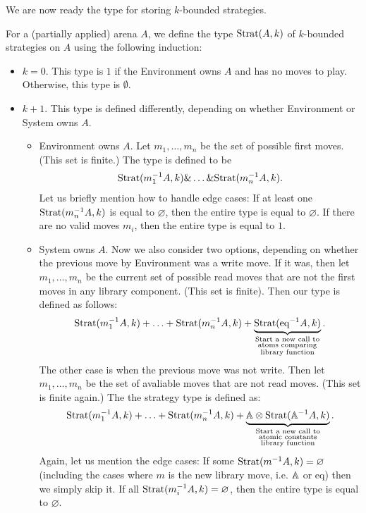 We are now ready the type for storing $k$-bounded strategies. 
\begin{definition}
    For a (partially applied) arena $A$, we define the type $\text{Strat}(A, k)$ of $k$-bounded strategies on $A$ using the following induction:
\begin{itemize}
    \item $k=0$. This type is $1$ if the Environment owns $A$ and has no moves to play. Otherwise, this type is $\emptyset$. 
    \item $k + 1$. This type is defined differently, depending on whether Environment or System owns $A$.
    \begin{itemize}
        \item Environment owns $A$. Let $m_1,\ldots,m_n$ be the set of possible first moves. (This set is finite.) The type is defined to be 
        \begin{align*}
            \text{Strat}(m_1^{-1}A, k) \& \ldots \& \text{Strat}(m_n^{-1}A, k).
        \end{align*}
        Let us briefly mention how to handle edge cases: If at least one $\text{Strat}(m_n^{-1}A, k)$ is equal to $\varnothing$, then 
        the entire type is equal to $\varnothing$. If there are no valid moves $m_i$, then the entire type is equal to $1$. 
        \item System owns $A$. Now we also consider two options, depending on whether the previous move by Environment was a write move. 
               If it was, then let $m_1, \ldots, m_n$ be the current set of possible read moves that are not the first moves in any library 
               component. (This set is finite). Then our type is defined as follows:
               \begin{align*}
                \text{Strat}(m_1^{-1}A, k) + \ldots + \text{Strat}(m_n^{-1}A, k) + \underbrace{\text{Strat}({\text{eq}}^{-1}A, k)}_{\substack{\textrm{Start a new call to}\\
                \textrm{atoms comparing}\\
                \textrm{library function}}}.
               \end{align*}
               The other case is when the previous move was not write. Then let $m_1, \ldots, m_n$ be the set of avaliable moves that are not read moves. 
               (This set is finite again.) The the strategy type is defined as: 
               \begin{align*}
                \text{Strat}(m_1^{-1}A, k) + \ldots + \text{Strat}(m_n^{-1}A, k) + \underbrace{\mathbb A \otimes \text{Strat}(\mathbb A^{-1}A, k)}_{\substack{\textrm{Start a new call to}\\
                \textrm{atomic constants}\\
                \textrm{library function}}}.
               \end{align*}
               Again, let us mention the edge cases: If some $\text{Strat}(m^{-1}A, k) = \varnothing$ (including the cases where $m$ is the new library move, i.e. $\mathbb A$ or $\text{eq}$)
               then we simply skip it. If all $\text{Strat}(m_i^{-1}A, k) = \varnothing$, then the entire type is equal to $\varnothing$. 
    \end{itemize}
\end{itemize}
\end{definition}
